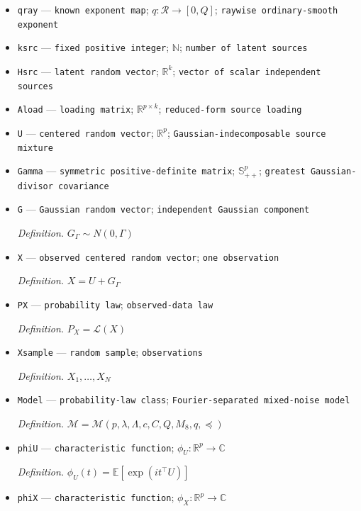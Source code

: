 \documentclass{article}
\begin{document}
\begin{itemize}
  \item \texttt{qray} --- \texttt{known exponent map}; \(q:\mathcal R\to[0,Q]\); \texttt{raywise ordinary-\allowbreak{}smooth exponent}
  \item \texttt{ksrc} --- \texttt{fixed positive integer}; \(\mathbb N\); \texttt{number of latent sources}
  \item \texttt{Hsrc} --- \texttt{latent random vector}; \(\mathbb R^{k}\); \texttt{vector of scalar independent sources}
  \item \texttt{Aload} --- \texttt{loading matrix}; \(\mathbb R^{p\times k}\); \texttt{reduced-\allowbreak{}form source loading}
  \item \texttt{U} --- \texttt{centered random vector}; \(\mathbb R^p\); \texttt{Gaussian-\allowbreak{}indecomposable source mixture}
  \item \texttt{Gamma} --- \texttt{symmetric positive-\allowbreak{}definite matrix}; \(\mathbb S_{++}^p\); \texttt{greatest Gaussian-\allowbreak{}divisor covariance}
  \item \texttt{G} --- \texttt{Gaussian random vector}; \texttt{independent Gaussian component}
  \par\smallskip\noindent\emph{Definition.} \(G_\Gamma\sim N(0,\Gamma)\)
  \item \texttt{X} --- \texttt{observed centered random vector}; \texttt{one observation}
  \par\smallskip\noindent\emph{Definition.} \(X=U+G_\Gamma\)
  \item \texttt{PX} --- \texttt{probability law}; \texttt{observed-\allowbreak{}data law}
  \par\smallskip\noindent\emph{Definition.} \(P_X=\mathcal L(X)\)
  \item \texttt{Xsample} --- \texttt{random sample}; \texttt{observations}
  \par\smallskip\noindent\emph{Definition.} \(X_1,\ldots,X_N\)
  \item \texttt{Model} --- \texttt{probability-\allowbreak{}law class}; \texttt{Fourier-\allowbreak{}separated mixed-\allowbreak{}noise model}
  \par\smallskip\noindent\emph{Definition.} \(\mathcal M=\mathcal M(p,\lambda,\Lambda,c,C,Q,M_8,q,\preceq)\)
  \item \texttt{phiU} --- \texttt{characteristic function}; \(\phi_U:\mathbb R^p\to\mathbb C\)
  \par\smallskip\noindent\emph{Definition.} \(\phi_U(t)=\mathbb E[\exp(i t^\top U)]\)
  \item \texttt{phiX} --- \texttt{characteristic function}; \(\phi_X:\mathbb R^p\to\mathbb C\)

\end{itemize}
\end{document}

